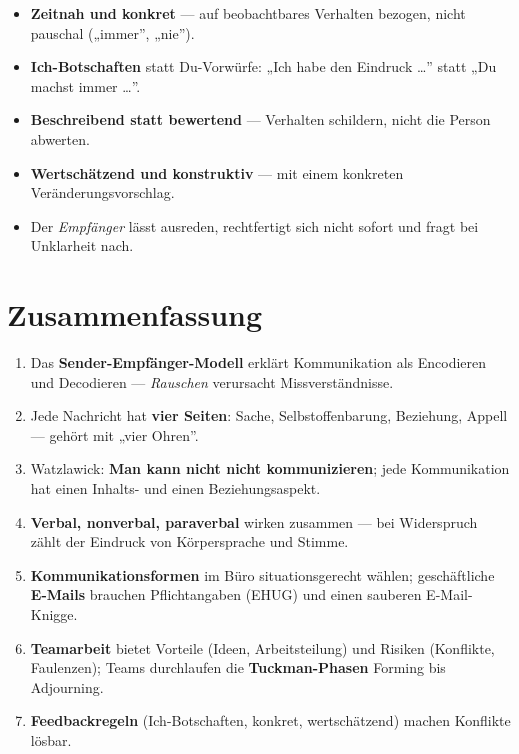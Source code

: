 \documentclass[11pt, a4paper]{article}
\begin{document}
\begin{itemize}
  \item \textbf{Zeitnah und konkret} --- auf beobachtbares Verhalten bezogen, nicht
    pauschal („immer”, „nie”).
  \item \textbf{Ich-Botschaften} statt Du-Vorwürfe: „Ich habe den Eindruck \dots” statt
    „Du machst immer \dots”.
  \item \textbf{Beschreibend statt bewertend} --- Verhalten schildern, nicht die Person
    abwerten.
  \item \textbf{Wertschätzend und konstruktiv} --- mit einem konkreten
    Veränderungsvorschlag.
  \item Der \emph{Empfänger} lässt ausreden, rechtfertigt sich nicht sofort und fragt bei
    Unklarheit nach.
\end{itemize}

\section{Zusammenfassung}

\begin{enumerate}
  \item Das \textbf{Sender-Empfänger-Modell} erklärt Kommunikation als Encodieren und
    Decodieren --- \emph{Rauschen} verursacht Missverständnisse.
  \item Jede Nachricht hat \textbf{vier Seiten}: Sache, Selbstoffenbarung, Beziehung,
    Appell --- gehört mit „vier Ohren”.
  \item Watzlawick: \textbf{Man kann nicht nicht kommunizieren}; jede Kommunikation hat
    einen Inhalts- und einen Beziehungsaspekt.
  \item \textbf{Verbal, nonverbal, paraverbal} wirken zusammen --- bei Widerspruch zählt
    der Eindruck von Körpersprache und Stimme.
  \item \textbf{Kommunikationsformen} im Büro situationsgerecht wählen; geschäftliche
    \textbf{E-Mails} brauchen Pflichtangaben (EHUG) und einen sauberen E-Mail-Knigge.
  \item \textbf{Teamarbeit} bietet Vorteile (Ideen, Arbeitsteilung) und Risiken (Konflikte,
    Faulenzen); Teams durchlaufen die \textbf{Tuckman-Phasen} Forming bis Adjourning.
  \item \textbf{Feedbackregeln} (Ich-Botschaften, konkret, wertschätzend) machen Konflikte
    lösbar.
\end{enumerate}

\newpage
\end{document}
